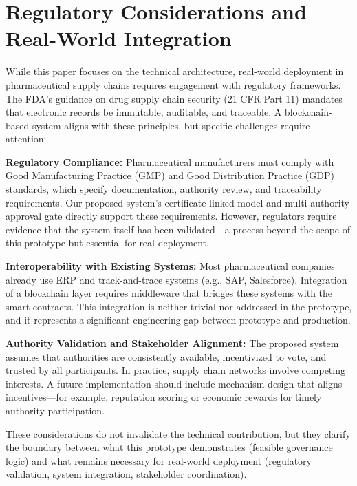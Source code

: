\section{Regulatory Considerations and Real-World Integration}

While this paper focuses on the technical architecture, real-world deployment in pharmaceutical supply chains requires engagement with regulatory frameworks. The FDA's guidance on drug supply chain security (21 CFR Part 11) mandates that electronic records be immutable, auditable, and traceable. A blockchain-based system aligns with these principles, but specific challenges require attention:

\textbf{Regulatory Compliance:} Pharmaceutical manufacturers must comply with Good Manufacturing Practice (GMP) and Good Distribution Practice (GDP) standards, which specify documentation, authority review, and traceability requirements. Our proposed system's certificate-linked model and multi-authority approval gate directly support these requirements. However, regulators require evidence that the system itself has been validated—a process beyond the scope of this prototype but essential for real deployment.

\textbf{Interoperability with Existing Systems:} Most pharmaceutical companies already use ERP and track-and-trace systems (e.g., SAP, Salesforce). Integration of a blockchain layer requires middleware that bridges these systems with the smart contracts. This integration is neither trivial nor addressed in the prototype, and it represents a significant engineering gap between prototype and production.

\textbf{Authority Validation and Stakeholder Alignment:} The proposed system assumes that authorities are consistently available, incentivized to vote, and trusted by all participants. In practice, supply chain networks involve competing interests. A future implementation should include mechanism design that aligns incentives—for example, reputation scoring or economic rewards for timely authority participation.

These considerations do not invalidate the technical contribution, but they clarify the boundary between what this prototype demonstrates (feasible governance logic) and what remains necessary for real-world deployment (regulatory validation, system integration, stakeholder coordination).